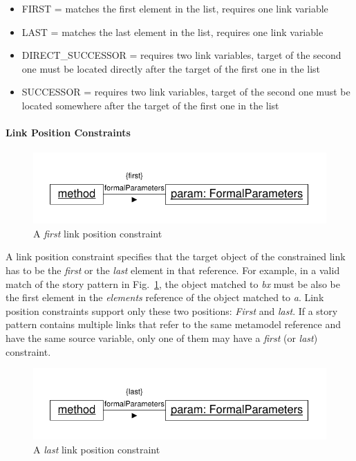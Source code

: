 {\begin{itemize}
  \item FIRST = matches the first element in the list, requires one link variable
  \item LAST = matches the last element in the list, requires one link variable
  \item DIRECT\_SUCCESSOR = requires two link variables, target of the second one must be located directly after the target of the first one in the list
  \item SUCCESSOR = requires two link variables, target of the second one must be located somewhere after the target of the first one in the list
\end{itemize}


\paragraph{Link Position Constraints}

\begin{figure}[htbp]
\center
\includegraphics[width=0.75\columnwidth]{figures/LinkPositionConstraintFirst}
\caption{A \emph{first} link position constraint}
\label{fig:linkPositionConstraints:linkPositionConstraint1}
\end{figure}

A link position constraint specifies that the target object of the constrained link has to be the \emph{first} or the \emph{last} element in that reference. For example, in a valid match of the story pattern in Fig.~\ref{fig:linkPositionConstraints:linkPositionConstraint1}, the object matched to \emph{bx} must be also be the first element in the \emph{elements} reference of the object matched to \emph{a}. Link position constraints support only these two positions: \emph{First} and \emph{last}. If a story pattern contains multiple links that refer to the same metamodel reference and have the same source variable, only one of them may have a \emph{first} (or \emph{last}) constraint.


\begin{figure}[htbp]
\center
\includegraphics[width=0.75\columnwidth]{figures/LinkPositionConstraintLast}
\caption{A \emph{last} link position constraint}
\label{fig:linkPositionConstraints:linkPositionConstraint3}
\end{figure}

}
